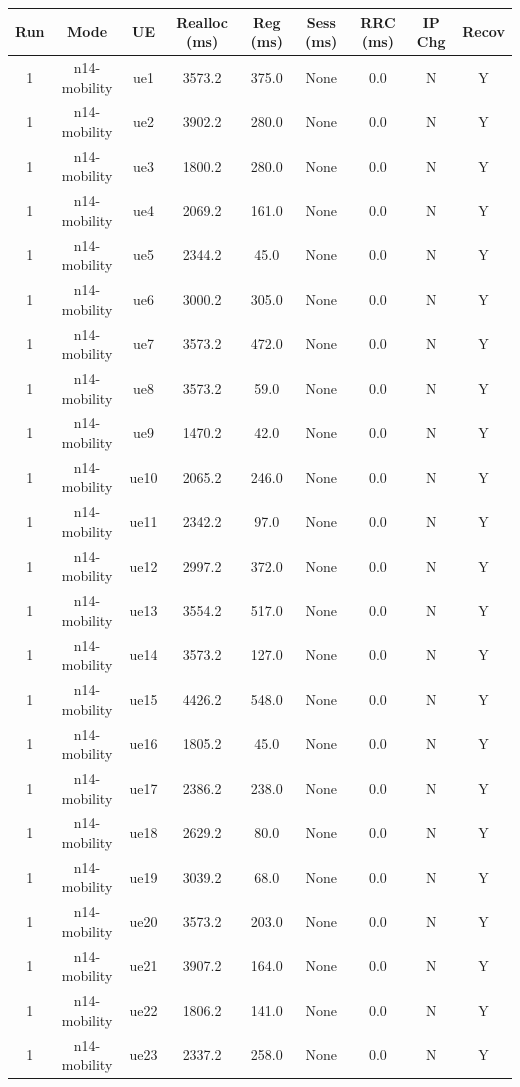 \begin{table}[ht]
\centering
\begin{tabular}{|c|c|c|c|c|c|c|c|c|}
\hline
Run & Mode & UE & Realloc (ms) & Reg (ms) & Sess (ms) & RRC (ms) & IP Chg & Recov \\
\hline
1 & n14-mobility & ue1 & 3573.2 & 375.0 & None & 0.0 & N & Y \\
1 & n14-mobility & ue2 & 3902.2 & 280.0 & None & 0.0 & N & Y \\
1 & n14-mobility & ue3 & 1800.2 & 280.0 & None & 0.0 & N & Y \\
1 & n14-mobility & ue4 & 2069.2 & 161.0 & None & 0.0 & N & Y \\
1 & n14-mobility & ue5 & 2344.2 & 45.0 & None & 0.0 & N & Y \\
1 & n14-mobility & ue6 & 3000.2 & 305.0 & None & 0.0 & N & Y \\
1 & n14-mobility & ue7 & 3573.2 & 472.0 & None & 0.0 & N & Y \\
1 & n14-mobility & ue8 & 3573.2 & 59.0 & None & 0.0 & N & Y \\
1 & n14-mobility & ue9 & 1470.2 & 42.0 & None & 0.0 & N & Y \\
1 & n14-mobility & ue10 & 2065.2 & 246.0 & None & 0.0 & N & Y \\
1 & n14-mobility & ue11 & 2342.2 & 97.0 & None & 0.0 & N & Y \\
1 & n14-mobility & ue12 & 2997.2 & 372.0 & None & 0.0 & N & Y \\
1 & n14-mobility & ue13 & 3554.2 & 517.0 & None & 0.0 & N & Y \\
1 & n14-mobility & ue14 & 3573.2 & 127.0 & None & 0.0 & N & Y \\
1 & n14-mobility & ue15 & 4426.2 & 548.0 & None & 0.0 & N & Y \\
1 & n14-mobility & ue16 & 1805.2 & 45.0 & None & 0.0 & N & Y \\
1 & n14-mobility & ue17 & 2386.2 & 238.0 & None & 0.0 & N & Y \\
1 & n14-mobility & ue18 & 2629.2 & 80.0 & None & 0.0 & N & Y \\
1 & n14-mobility & ue19 & 3039.2 & 68.0 & None & 0.0 & N & Y \\
1 & n14-mobility & ue20 & 3573.2 & 203.0 & None & 0.0 & N & Y \\
1 & n14-mobility & ue21 & 3907.2 & 164.0 & None & 0.0 & N & Y \\
1 & n14-mobility & ue22 & 1806.2 & 141.0 & None & 0.0 & N & Y \\
1 & n14-mobility & ue23 & 2337.2 & 258.0 & None & 0.0 & N & Y \\

\end{tabular}
\end{table}
